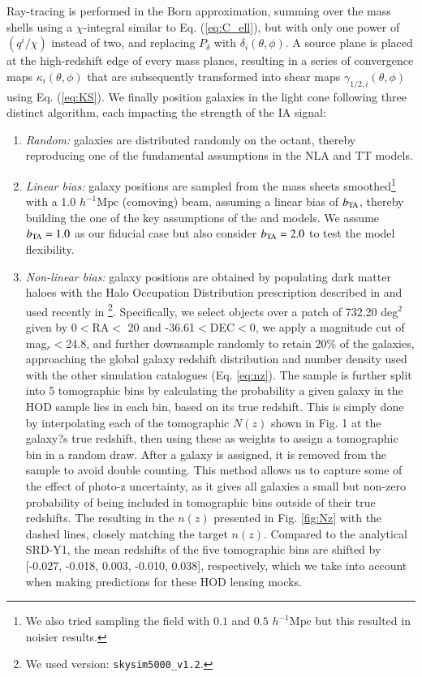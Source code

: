 Ray-tracing is performed in the Born approximation, summing over the mass shells using a $\chi$-integral similar to Eq. (\ref{eq:C_ell}), but with only one power of $(q^i/\chi)$ instead of two, and replacing $P_\delta$ with $\delta_i(\theta,\phi)$.
A source plane is placed at the high-redshift edge of every mass planes, resulting in a series of convergence  maps $\kappa_i(\theta,\phi)$ that are subsequently transformed into shear maps $\gamma_{1/2, i}(\theta,\phi)$ using Eq. (\ref{eq:KS}).
We finally position galaxies in the light cone following three distinct algorithm, each impacting the strength of the IA signal:
\begin{enumerate}
\item {\it Random:} galaxies are distributed randomly on the octant, thereby reproducing one of the  fundamental assumptions in the NLA and TT models. 
\item {\it Linear bias:} galaxy positions are sampled from the mass sheets smoothed\footnote{We also tried sampling the field with $0.1$ and $0.5$ $h^{-1}\mathrm{Mpc}$ but this resulted in noisier results.} with a 1.0 $h^{-1}\mathrm{Mpc}$ (comoving) beam, assuming a linear bias of $b_{\rm TA}$, thereby building the one of the key assumptions of the \dNLA and \dTT models. 
We assume $b_{\rm TA}=1.0$ as our fiducial case but also consider $b_{\rm TA}=2.0$ to test  the  model flexibility. 
\item{\it Non-linear bias:} galaxy positions are obtained by populating dark matter haloes with the Halo Occupation Distribution prescription described in \citet{cosmoDC2} and used recently in \citet{TXPipe}\footnote{We used version: {\tt skysim5000\_v1.2}.}. Specifically, we select objects over a patch of 732.20 deg$^2$ given by  0$<$RA$<$ 20 and -36.61$<$DEC$<$0, we apply a magnitude cut of mag$_r<$24.8, and further downsample randomly to retain 20\% of the galaxies, approaching the global galaxy redshift distribution and number density used with the other simulation catalogues (Eq. \ref{eq:nz}).
The sample is further split into 5 tomographic bins by calculating the probability a given galaxy in the HOD sample lies in each bin, based on its true redshift. This is simply done by interpolating each of the tomographic $N(z)$ shown in Fig. 1 at the galaxy?s true redshift, then using these as weights to assign a tomographic bin in a random draw. After a galaxy is assigned, it is removed from the sample to avoid double counting. This method allows us to capture some of the effect of photo-z uncertainty, as it gives all galaxies a small but non-zero probability of being included in tomographic bins outside of their true redshifts. The resulting in the $n(z)$ presented in Fig. \ref{fig:Nz} with the dashed lines, closely matching the target $n(z)$. Compared to the analytical SRD-Y1, the mean redshifts of the five tomographic bins are shifted by [-0.027, -0.018,  0.003, -0.010,  0.038], respectively, which we take into account when making predictions for these HOD lensing mocks.
\end{enumerate}
